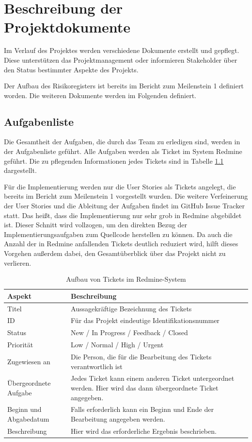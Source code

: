 \documentclass[a4paper,11pt,listof=numbered,glossary=totoc,parskip=half,toc=bib]{scrreprt}
\begin{document}
	
	\newpage
	\setcounter{tocdepth}{2}
	\tableofcontents
	
	\newpage
	\chapter{Beschreibung der Projektdokumente}

	Im Verlauf des Projektes werden verschiedene Dokumente erstellt und gepflegt. Diese unterstützen das Projektmanagement oder informieren Stakeholder über den Status bestimmter Aspekte des Projekts.
	
	Der Aufbau des Risikoregisters ist bereits im Bericht zum Meilenstein 1 definiert worden. Die weiteren Dokumente werden im Folgenden definiert.
	
	\section{Aufgabenliste}
	Die Gesamtheit der Aufgaben, die durch das Team zu erledigen sind, werden in der Aufgabenliste geführt. Alle Aufgaben werden als Ticket im System Redmine geführt. Die zu pflegenden Informationen jedes Tickets sind in Tabelle \ref{tab:tickets} dargestellt. 
	
	Für die Implementierung werden nur die User Stories als Tickets angelegt, die bereits im Bericht zum Meilenstein 1 vorgestellt wurden. Die weitere Verfeinerung der User Stories und die Ableitung der Aufgaben findet im GitHub Issue Tracker statt. Das heißt, dass die Implementierung nur sehr grob in Redmine abgebildet ist. Dieser Schnitt wird vollzogen, um den direkten Bezug der Implementierungsaufgaben zum Quellcode herstellen zu können. Da auch die Anzahl der in Redmine anfallenden Tickets deutlich reduziert wird, hilft dieses Vorgehen außerdem dabei, den Gesamtüberblick über das Projekt nicht zu verlieren.
	\begin{table}
		\centering
		\begin{tabularx}{\textwidth}{lX}
			\toprule
			\textbf{Aspekt} & \textbf{Beschreibung} \\
			\midrule
			Titel & Aussagekräftige Bezeichnung des Tickets \\
			ID & Für das Projekt eindeutige Identifikationsnummer \\
			Status & New / In Progress / Feedback / Closed \\
			Priorität & Low / Normal / High / Urgent \\
			Zugewiesen an & Die Person, die für die Bearbeitung des Tickets verantwortlich ist \\
			Übergeordnete Aufgabe & Jedes Ticket kann einem anderen Ticket untergeordnet werden. Hier wird das dann übergeordnete Ticket angegeben. \\
			Beginn und Abgabedatum & Falls erforderlich kann ein Beginn und Ende der Bearbeitung angegeben werden. \\
			Beschreibung & Hier wird das erforderliche Ergebnis beschrieben.\\
			\bottomrule
		\end{tabularx}
		\caption{Aufbau von Tickets im Redmine-System}
		\label{tab:tickets}
	\end{table}	
	
\end{document}
